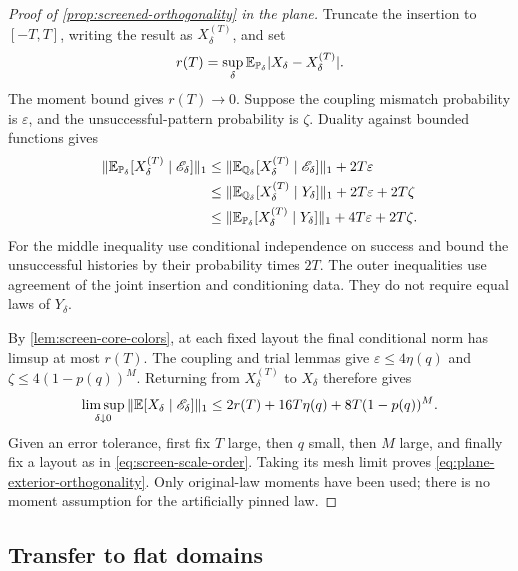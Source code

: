 \begin{proof}[Proof of \cref{prop:screened-orthogonality} in the plane]
Truncate the insertion to $[-T,T]$, writing the result as
$X_\delta^{(T)}$, and set
\[
 r(T)=\sup_\delta\mathbb E_{\mathbb P_\delta}
             |X_\delta-X_\delta^{(T)}|.
\]
The moment bound gives $r(T)\to0$. Suppose the coupling mismatch
probability is $\varepsilon$, and the unsuccessful-pattern probability
is $\zeta$. Duality against bounded functions gives
\begin{align}
 \|\mathbb E_{\mathbb P_\delta}[X_\delta^{(T)}\mid\mathscr E_\delta]\|_1
 &\le
 \|\mathbb E_{\mathbb Q_\delta}
            [X_\delta^{(T)}\mid\mathscr E_\delta]\|_1
       +2T\varepsilon\notag\\
 &\le
 \|\mathbb E_{\mathbb Q_\delta}[X_\delta^{(T)}\mid Y_\delta]\|_1
       +2T\varepsilon+2T\zeta\notag\\
 &\le
 \|\mathbb E_{\mathbb P_\delta}[X_\delta^{(T)}\mid Y_\delta]\|_1
       +4T\varepsilon+2T\zeta.
 \label{eq:screen-bounded-coupling}
\end{align}
For the middle inequality use conditional independence on success and
bound the unsuccessful histories by their probability times $2T$.
The outer inequalities use agreement of the joint insertion and
conditioning data. They do not require equal laws of $Y_\delta$.

By \cref{lem:screen-core-colors}, at each fixed layout the final
conditional norm has limsup at most $r(T)$. The coupling and trial
lemmas give $\varepsilon\le4\eta(q)$ and
$\zeta\le4(1-p(q))^M$. Returning from $X_\delta^{(T)}$ to $X_\delta$
therefore gives
\[
 \limsup_{\delta\downarrow0}
 \|\mathbb E[X_\delta\mid\mathscr E_\delta]\|_1
 \le 2r(T)+16T\eta(q)+8T(1-p(q))^M.
\]
Given an error tolerance, first fix $T$ large, then $q$ small, then
$M$ large, and finally fix a layout as in \eqref{eq:screen-scale-order}.
Taking its mesh limit proves \eqref{eq:plane-exterior-orthogonality}.
Only original-law moments have been used; there is no moment assumption
for the artificially pinned law.
\end{proof}

\subsection{Transfer to flat domains}

